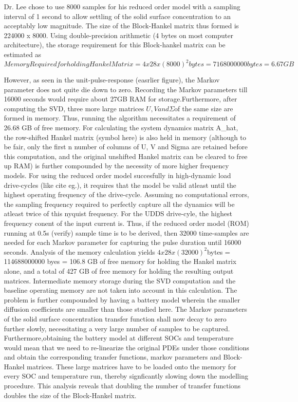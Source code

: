 Dr. Lee chose  to use 8000 samples  for his reduced order model  with a sampling
interval of 1 second to allow settling  of the solid surface concentration to an
acceptably low  magnitude. The size  of the  Block-Hankel matrix thus  formed is
224000  x 8000.  Using double-precision  arithmetic  (4 bytes  on most  computer
architecture),  the storage  requirement  for this  Block-hankel  matrix can  be
estimated as
\[
MemoryRequiredforholdingHankelMatrix=4x28x(8000)^{2}bytes=7168000000bytes=6.67GB
\]

However,  as  seen in  the  unit-pulse-response  (easrlier figure),  the  Markov
parameter does not quite die down  to zero. Recording the Markov parameters till
16000  seconds  would require  about  27GB  RAM for  storage.Furthermore,  after
computing the SVD, three more large  matrices $U,Vand\Sigma$of the same size are
formed  in memory.  Thus, running  the algorithm  necessitates a  requirement of
26.68 GB of free memory. For  calculating the system dynamics matrix A\_hat, the
row-shifted Hankel matrix  (symbol here) is also held in  memory (although to be
fair, only the first  n number of columns of U, V and  Sigma are retained before
this computation,  and the original  unshifted Hankel  matrix can be  cleared to
free up  RAM) is further  compounded by the  necessity of more  higher frequency
models.  For using  the reduced  order  model succesfully  in high-dynamic  load
drive-cycles (like cite eg.), it requires  that the model be valid atleast until
the highest  operating frequency of  the drive-cycle. Assuming  no computational
errors, the  sampling frequency required  to perfectly capture all  the dynamics
will be  atleast twice of this  nyquist frequency. For the  UDDS drive-cyle, the
highest frequency  conent of the  input current is.  Thus, if the  reduced order
model (ROM) running  at 0.5s (verify) sample  time is to be  derived, then 32000
time-samples  are needed  for  each  Markov parameter  for  capturing the  pulse
duration  until  16000  seconds.  Analysis  of  the  memory  calculation  yields
$4x28x(32000)^{2}$bytes  = 114688000000  byes  =  106.8 GB  of  free memory  for
holding  the Hankel  matrix alone,  and a  total of  427 GB  of free  memory for
holding the  resulting output matrices.  Intermediate memory storage  during the
SVD computation and the baseline operating  memory are not taken into account in
this calculation.  The problem is further  compounded by having a  battery model
wherein the smaller diffusion coefficients  are smaller than those studied here.
The Markov parameters of the solid surface concentration transfer function shall
now decay to  zero further slowly, necessitating a very  large number of samples
to be  captured. Furthermore,obtaining the  battery model at different  SOCs and
temperature would  mean that  we need  to re-linearize  the original  PDEs under
those  conditions  and  obtain  the  corresponding  transfer  functions,  markov
parameters and  Block-Hankel matrices.  These large matrices  have to  be loaded
onto the memory for every SOC  and temperature run, thereby signficantly slowing
down the modelling procedure. This analysis  reveals that doubling the number of
transfer functions doubles the size of the Block-Hankel matrix.

